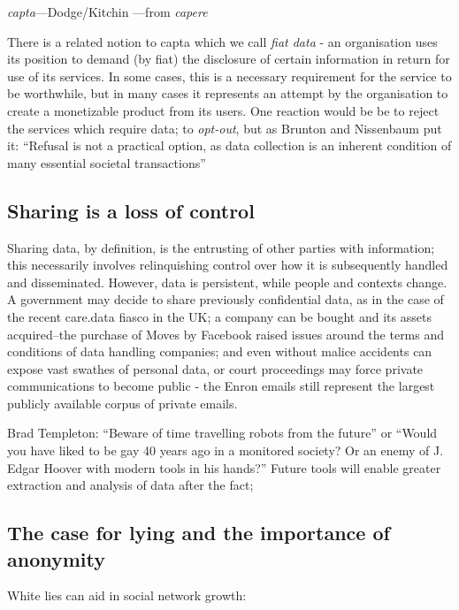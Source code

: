 \documentclass{IOS-Book-Article}     %
\begin{document}
\emph{capta}---Dodge/Kitchin \cite{dodge2005Forgetting}---from \emph{capere}

There is a related notion to capta which we call \emph{fiat data} - an
organisation uses its position to demand (by fiat) the disclosure of certain
information in return for use of its services. In some cases, this is a
necessary requirement for the service to be worthwhile, but in many cases it
represents an attempt by the organisation to create a monetizable product from
its users. One reaction would be be to reject the services which require data;
to \emph{opt-out}, but as Brunton and Nissenbaum put it:
``Refusal is not a practical option, as data collection is an inherent condition
of many essential societal transactions''
\cite{brunton2011vernacular}

\subsection*{Sharing is a loss of control}

Sharing data, by definition, is the entrusting of other parties with
information; this necessarily involves relinquishing control over how it is
subsequently handled and disseminated. However, data is persistent, while people
and contexts change. A government may decide to share previously confidential
data, as in the case of the recent care.data fiasco in the UK; a company can be
bought and its assets acquired–the purchase of Moves by Facebook raised issues
around the terms and conditions of data handling companies; and even without
malice accidents can expose vast swathes of personal data, or court proceedings
may force private communications to become public - the Enron emails still
represent the largest publicly available corpus of private emails.  

Brad Templeton: ``Beware of time travelling robots from the future'' or ``Would
you have liked to be gay 40 years ago in a monitored society? Or an enemy of J.
Edgar Hoover with modern tools in his hands?'' \cite{templetonWatched}
Future tools will enable greater extraction and analysis of data after the fact;

\subsection*{The case for lying and the importance of anonymity}

White lies can aid in social network growth: \cite{iniguez2014Deception}
\end{document}
